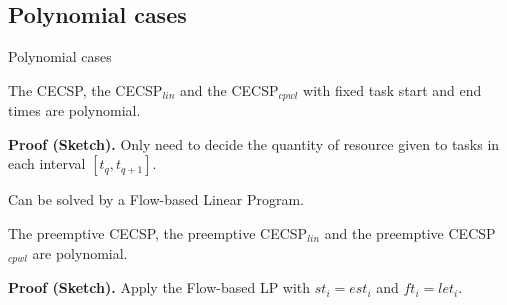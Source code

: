 \subsection{Polynomial cases}
\begin{frame}{Polynomial cases}
  \vfill
  \begin{theorem}
    The CECSP, the CECSP$_{lin}$ and the CECSP$_{cpwl}$ with fixed
    task start and end times are polynomial.  
  \end{theorem}
  \vfill
\pause
 {\bf Proof (Sketch). } Only need to decide the quantity of resource
 given to tasks in each interval $[t_{q},t_{q+1}]$.


\pause
 Can be solved by a Flow-based Linear Program.
 \vfill
\pause
  \begin{theorem}
The preemptive CECSP, the preemptive CECSP$_{lin}$ and the preemptive CECSP$_{cpwl}$ are polynomial.  
  \end{theorem}
  \vfill
\pause
  
 {\bf Proof (Sketch). } Apply the Flow-based LP with $st_i=est_i$ and $ft_i=let_i$.
 \vfill
\end{frame}



